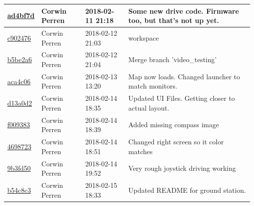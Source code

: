 \begin{center}
\begin{tabular}{l l l l}
\href{https://github.com/OSURoboticsClub/Rover_2017_2018/commit/ad4bf7d74c408d05a6d1788f1b981c0c8380865d}{ad4bf7d} & Corwin Perren & 2018-02-11 21:18 &Some new drive code. Firmware too, but that's not up yet.\\\hline
\href{https://github.com/OSURoboticsClub/Rover_2017_2018/commit/c90247643f816b5add089c604804ead6e8a73b3e}{c902476} & Corwin Perren & 2018-02-12 21:03 &workspace\\\hline
\href{https://github.com/OSURoboticsClub/Rover_2017_2018/commit/b5be2a6f2472909ed06ee3535c4eec78f6c601ab}{b5be2a6} & Corwin Perren & 2018-02-12 21:04 &Merge branch 'video\_testing'\\\hline
\href{https://github.com/OSURoboticsClub/Rover_2017_2018/commit/aca4c0627c3ce4ed2f6b3c4513e8ffccbb2b2277}{aca4c06} & Corwin Perren & 2018-02-13 13:20 &Map now loads. Changed launcher to match monitors.\\\hline
\href{https://github.com/OSURoboticsClub/Rover_2017_2018/commit/d13a0d2d69b27b816e33b2eade6f1e9f102bc0ef}{d13a0d2} & Corwin Perren & 2018-02-14 18:35 &Updated UI Files. Getting closer to actual layout.\\\hline
\href{https://github.com/OSURoboticsClub/Rover_2017_2018/commit/f009383b3eb6f0868cc842b70d3430cd41be3816}{f009383} & Corwin Perren & 2018-02-14 18:39 &Added missing compass image\\\hline
\href{https://github.com/OSURoboticsClub/Rover_2017_2018/commit/4698723bb0e747fb52d420056f2822ff04005f9d}{4698723} & Corwin Perren & 2018-02-14 18:51 &Changed right screen so it color matches\\\hline
\href{https://github.com/OSURoboticsClub/Rover_2017_2018/commit/9b3fd50188b3a7504998bac4456ce3717f8a827b}{9b3fd50} & Corwin Perren & 2018-02-14 19:52 &Very rough joystick driving working\\\hline
\href{https://github.com/OSURoboticsClub/Rover_2017_2018/commit/b54c8c38566fa1de3f41249c2f4ac9f58b08f4ab}{b54c8c3} & Corwin Perren & 2018-02-15 18:33 &Updated README for ground station.\\\hline
\end{tabular}
\end{center}